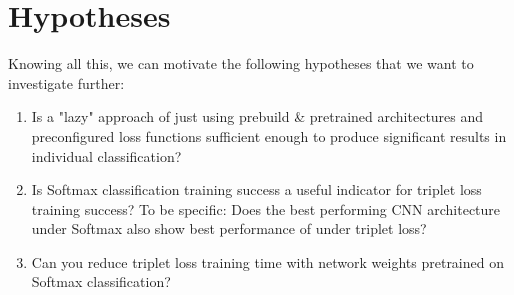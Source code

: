 \section{Hypotheses}
\label{sec:hypotheses}

Knowing all this, we can motivate the following hypotheses that we want to investigate further:

\begin{enumerate}
    \item Is a "lazy" approach of just using prebuild \& pretrained architectures and preconfigured loss functions sufficient enough to produce significant results in individual classification?
    \item Is Softmax classification training success a useful indicator for triplet loss training success? To be specific: Does the best performing CNN architecture under Softmax also show best performance of under triplet loss?
    \item Can you reduce triplet loss training time with network weights pretrained on Softmax classification?
\end{enumerate}